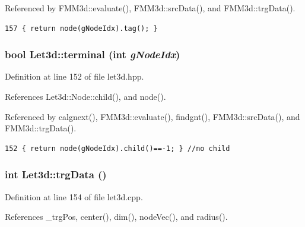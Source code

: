 Referenced by FMM3d::evaluate(), FMM3d::src\-Data(), and FMM3d::trg\-Data().

\footnotesize\begin{verbatim}157 { return node(gNodeIdx).tag(); }
\end{verbatim}\normalsize 


\subsubsection{\setlength{\rightskip}{0pt plus 5cm}bool Let3d::terminal (int {\em g\-Node\-Idx})\hspace{0.3cm}{\tt  [inline]}}\label{classLet3d_8bef6e640d1f466fdac02445bb2873ef_8bef6e640d1f466fdac02445bb2873ef}




Definition at line 152 of file let3d.hpp.

References Let3d::Node::child(), and node().

Referenced by calgnext(), FMM3d::evaluate(), findgnt(), FMM3d::src\-Data(), and FMM3d::trg\-Data().

\footnotesize\begin{verbatim}152 { return node(gNodeIdx).child()==-1; } //no child
\end{verbatim}\normalsize 


\subsubsection{\setlength{\rightskip}{0pt plus 5cm}int Let3d::trg\-Data ()}\label{classLet3d_ca481263feff458d83769363d3ad85f7_ca481263feff458d83769363d3ad85f7}




Definition at line 154 of file let3d.cpp.

References \_\-trg\-Pos, center(), dim(), node\-Vec(), and radius().

